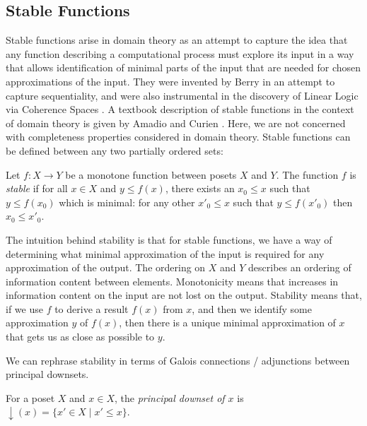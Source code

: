\subsection{Stable Functions}
\label{sec:stable-functions}

Stable functions arise in domain theory as an attempt to capture the
idea that any function describing a computational process must explore
its input in a way that allows identification of minimal parts of the
input that are needed for chosen approximations of the input. They
were invented by Berry \cite{berry86} in an attempt to capture
sequentiality, and were also instrumental in the discovery of Linear
Logic via Coherence Spaces \cite{girard}. A textbook description of
stable functions in the context of domain theory is given by Amadio
and Curien \cite{amadio-curien}. Here, we are not concerned with
completeness properties considered in domain theory. Stable functions
can be defined between any two partially ordered sets:

\begin{definition}
  Let $f : X \to Y$ be a monotone function between posets $X$ and
  $Y$. The function $f$ is \emph{stable} if for all $x \in X$ and
  $y \leq f(x)$, there exists an $x_0 \leq x$ such that $y \leq f(x_0)$ which
  is minimal: for any other $x'_0 \leq x$ such that $y \leq f(x'_0)$ then
  $x_0 \leq x'_0$.
\end{definition}

The intuition behind stability is that for stable functions, we have a
way of determining what minimal approximation of the input is required
for any approximation of the output. The ordering on $X$ and $Y$
describes an ordering of information content between
elements. Monotonicity means that increases in information content on
the input are not lost on the output. Stability means that, if we use
$f$ to derive a result $f(x)$ from $x$, and then we identify some
approximation $y$ of $f(x)$, then there is a unique minimal
approximation of $x$ that gets us as close as possible to $y$.

We can rephrase stability in terms of Galois connections / adjunctions
between principal downsets.

\newcommand{\downset}[1]{\mathop{\downarrow}(#1)}

\begin{definition}
  For a poset $X$ and $x \in X$, the \emph{principal
    downset of $x$} is $\downset{x} = \{ x' \in X \mid x' \leq x \}$.
\end{definition}

